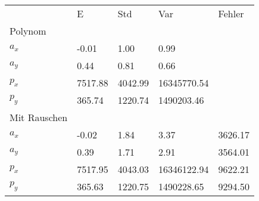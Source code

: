 \begin{tabular}{l|l|l|l|l}

         & E       & Std    & Var    & Fehler \\ 

\hhline{=|=|=|=|=}
Polynom & & & & \\ 

$a_x$  &        -0.01 &         1.00 &         0.99 & \\ 

$a_y$  &         0.44 &         0.81 &         0.66 & \\ 

$p_x$  &      7517.88 &      4042.99 &  16345770.54 & \\ 

$p_y$  &       365.74 &      1220.74 &   1490203.46 & \\ 

\hline 

Mit Rauschen & & & & \\ 

$a_x$  &        -0.02 &         1.84 &         3.37 &      3626.17 \\ 

$a_y$  &         0.39 &         1.71 &         2.91 &      3564.01 \\ 

$p_x$  &      7517.95 &      4043.03 &  16346122.94 &      9622.21 \\ 

$p_y$  &       365.63 &      1220.75 &   1490228.65 &      9294.50 \\ 

\end{tabular}

